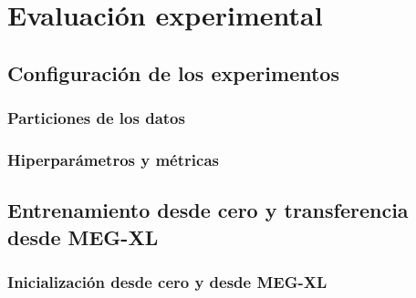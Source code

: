 \chapter{Evaluación experimental}

\section{Configuración de los experimentos}
\subsection{Particiones de los datos}
\subsection{Hiperparámetros y métricas}

\section{Entrenamiento desde cero y transferencia desde MEG-XL}

\subsection{Inicialización desde cero y desde MEG-XL}




